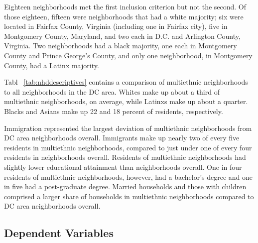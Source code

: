 \documentclass{baderart}
\begin{document}
Eighteen neighborhoods met the first inclusion criterion but not the second. Of those eighteen, fifteen were neighborhoods that had a white majority; six were located in Fairfax County, Virginia (including one in Fairfax city), five in Montgomery County, Maryland, and two each in D.C. and Arlington County, Virginia. Two neighborhoods had a black majority, one each in Montgomery County and Prince George's County, and only one neighborhood, in Montgomery County, had a Latinx majority.

Tabl~ \ref{tab:nhddescriptives} contains a comparison of multiethnic neighborhoods to all neighborhoods in the DC area. Whites make up about a third of multiethnic neighborhoods, on average, while Latinxs make up about a quarter. Blacks and Asians make up 22 and 18 percent of residents, respectively.


Immigration represented the largest deviation of multiethnic neighborhoods from DC area neighborhoods overall. Immigrants make up nearly two of every five residents in multiethnic neighborhoods, compared to just under one of every four residents in neighborhoods overall. Residents of multiethnic neighborhoods had slightly lower educational attainment than neighborhoods overall. One in four residents of multiethnic neighborhoods, however, had a bachelor's degree and one in five had a post-graduate degree. Married households and those with children comprised a larger share of households in multiethnic neighborhoods compared to DC area neighborhoods overall.


\subsection{Dependent Variables}\label{dependent-variables}
\end{document}
